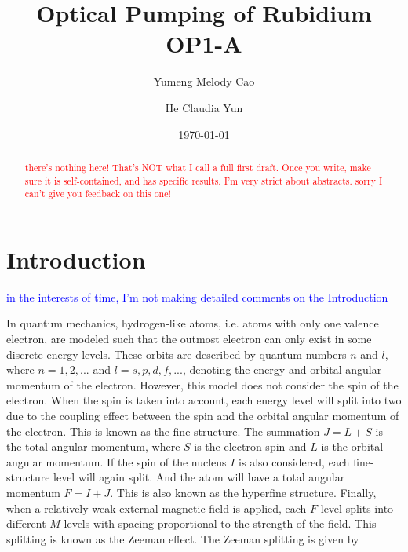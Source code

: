 \documentclass[prb,preprint]{revtex4-1}
\begin{document}
\title{Optical Pumping of Rubidium OP1-A}

\author{Yumeng Melody Cao}
\author{He Claudia Yun}


\date{\today}


\begin{abstract}
\textcolor{red}{there's nothing here! That's NOT what I call a full first draft. Once you write, make sure it is self-contained, and has specific results. I'm very strict about abstracts. sorry I can't give you feedback on this one! }
\end{abstract}

\maketitle 

\section{Introduction}

\textcolor{blue}{in the interests of time, I'm not making detailed comments on the Introduction}

In quantum mechanics, hydrogen-like atoms, i.e. atoms with only one valence electron, are modeled such that the outmost electron can only exist in some discrete energy levels. These orbits are described by quantum numbers $n$ and $l$, where $n=1, 2, ...$ and $l=s, p, d, f, ...$, denoting the energy and orbital angular momentum of the electron. However, this model does not consider the spin of the electron. When the spin is taken into account, each energy level will split into two due to the coupling effect between the spin and the orbital angular momentum of the electron. This is known as the fine structure. The summation $J=L+S$ is the total angular momentum, where $S$ is the electron spin and $L$ is the orbital angular momentum. If the spin of the nucleus $I$ is also considered, each fine-structure level will again split. And the atom will have a total angular momentum $F=I+J$. This is also known as the hyperfine structure. Finally, when a relatively weak external magnetic field is applied, each $F$ level splits into different $M$ levels with spacing proportional to the strength of the field. This splitting is known as the Zeeman effect. The Zeeman splitting is given by
\end{document}
